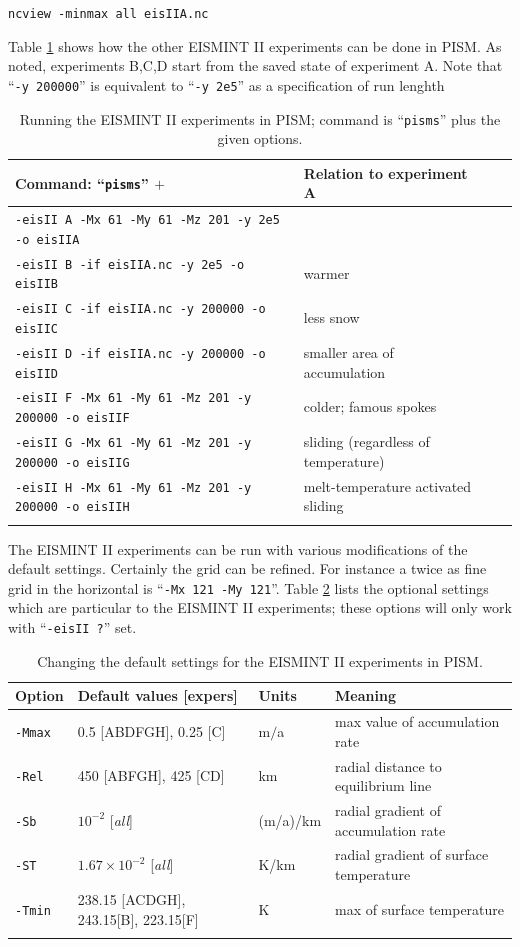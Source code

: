 \documentclass[12pt,final]{amsart}
\renewcommand{\t}[1]{\texttt{#1}}
\begin{document}
\verb|ncview -minmax all eisIIA.nc|

Table \ref{tab:eisII} shows how the other EISMINT II experiments can be done in PISM.  As noted, experiments B,C,D start from the saved state of experiment A.  Note that ``\t{-y 200000}'' is equivalent to ``\t{-y 2e5}'' as a specification of run lenghth

\begin{table}[h]
\caption{Running the EISMINT II experiments in PISM; command is ``\t{pisms}'' plus the given options.}\label{tab:eisII}
\small
\begin{tabular}{@{}llll}\hline
\textbf{Command: ``\t{pisms}'' $+$} & \textbf{Relation to experiment A} \\ \hline
\verb|-eisII A -Mx 61 -My 61 -Mz 201 -y 2e5 -o eisIIA| & \\
\verb|-eisII B -if eisIIA.nc -y 2e5 -o eisIIB| & warmer \\
\verb|-eisII C -if eisIIA.nc -y 200000 -o eisIIC| & less snow \\
\verb|-eisII D -if eisIIA.nc -y 200000 -o eisIID| & smaller area of accumulation \\
\verb|-eisII F -Mx 61 -My 61 -Mz 201 -y 200000 -o eisIIF| & colder; famous spokes \cite{BBL} \\
\verb|-eisII G -Mx 61 -My 61 -Mz 201 -y 200000 -o eisIIG| & sliding (regardless of temperature) \\
\verb|-eisII H -Mx 61 -My 61 -Mz 201 -y 200000 -o eisIIH| & melt-temperature activated sliding \\
\hline\normalsize
\end{tabular}\end{table}

The EISMINT II experiments can be run with various modifications of the default settings.  Certainly the grid can be refined.  For instance a twice as fine grid in the horizontal is ``\t{-Mx 121 -My 121}''.  Table \ref{tab:eisIIoptions} lists the optional settings which are particular to the EISMINT II experiments; these options will only work with ``\t{-eisII ?}'' set.

\begin{table}[h]
\caption{Changing the default settings for the EISMINT II experiments in PISM.}\label{tab:eisIIoptions}
\small
\begin{tabular}{@{}llll}\hline
\textbf{Option} & \textbf{Default values [expers]} & \textbf{Units} & \textbf{Meaning} \\ \hline
\verb|-Mmax| & 0.5 [ABDFGH], 0.25 [C] & m$/$a & max value of accumulation rate \\
\verb|-Rel| & 450 [ABFGH], 425 [CD] & km & radial distance to equilibrium line \\
\verb|-Sb| & $10^{-2}$ [\emph{all}] & (m/a)/km & radial gradient of accumulation rate \\
\verb|-ST| & $1.67 \times 10^{-2}$ [\emph{all}] & K/km & radial gradient of surface temperature\\
\verb|-Tmin| & 238.15 [ACDGH], 243.15[B], 223.15[F] & K & max of surface temperature \\
\hline\normalsize
\end{tabular}\end{table}
\end{document}

